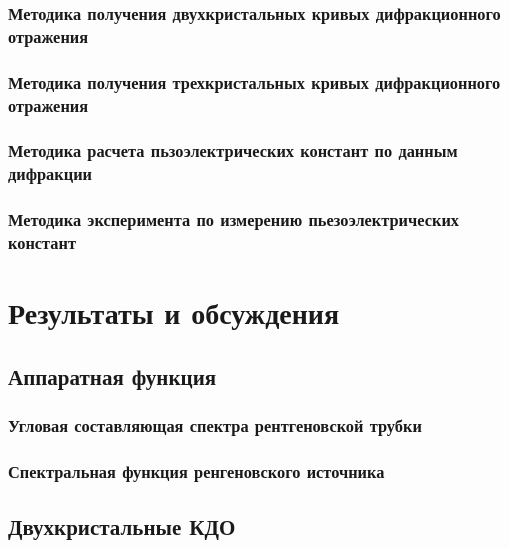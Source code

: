 \documentclass[pdftex,a4paper,14pt,english,russian]{extarticle}
\numberwithin{equation}{subsection}
\newcounter{subsubsubsection}[subsubsection]
\begin{document}
    \subsubsection{Методика получения двухкристальных кривых дифракционного отражения}
      
      
    \subsubsection{Методика получения трехкристальных кривых дифракционного отражения}
        


        
    \subsubsection{Методика расчета пьзоэлектрических констант по данным дифракции}
      
      \subsubsection{Методика эксперимента по измерению пьезоэлектрических констант}
            
            


\newpage
\section{Результаты и обсуждения}
  \subsection{Аппаратная функция}
  \subsubsection{Угловая составляющая спектра рентгеновской трубки}
    
  \subsubsection{Спектральная функция ренгеновского источника}
      
  \subsection{Двухкристальные КДО}
    
    
    
\end{document}
